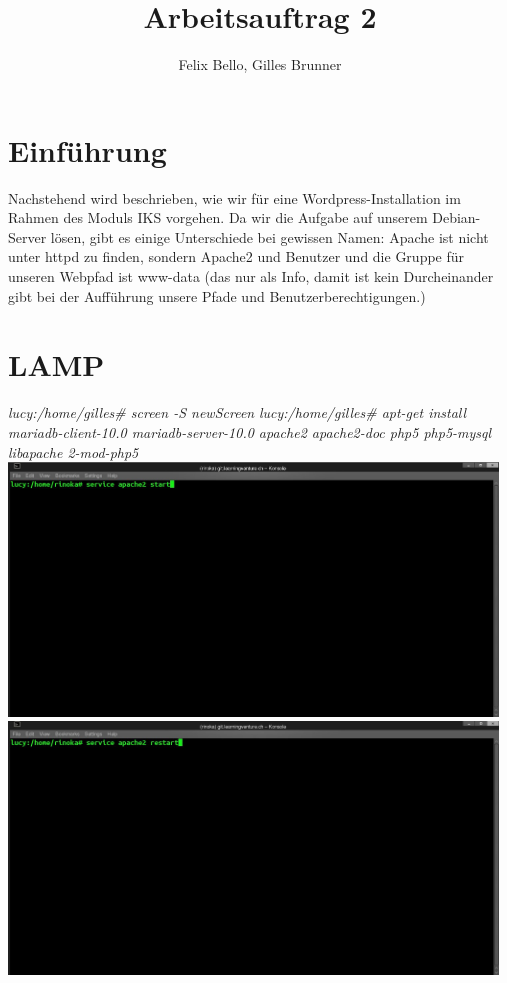 \documentclass{article}
\author{Felix Bello, Gilles Brunner}
\title{Arbeitsauftrag 2}
\begin{document}
	\maketitle
	\section{Einführung}
Nachstehend wird beschrieben, wie wir für eine Wordpress-Installation im Rahmen des Moduls IKS vorgehen. Da wir die Aufgabe auf unserem Debian-Server lösen, gibt es einige Unterschiede bei gewissen Namen: Apache ist nicht unter httpd zu finden, sondern Apache2 und Benutzer und die Gruppe für unseren Webpfad ist www-data (das nur als Info, damit ist kein Durcheinander gibt bei der Aufführung unsere Pfade und 	Benutzerberechtigungen.)
	\section{LAMP}
	\textit{lucy:/home/gilles\# screen -S newScreen}
	\newline
	\textit{lucy:/home/gilles\# apt-get install mariadb-client-10.0 mariadb-server-10.0 apache2 apache2-doc php5 php5-mysql libapache 2-mod-php5}
	\newline
	\includegraphics[width=13cm]{../Pics/start_apache}
	\newline
	\includegraphics[width=13cm]{../Pics/apach2restart}
	\newline
\end{document}
